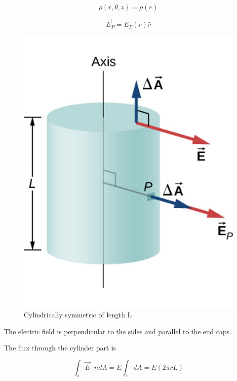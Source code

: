 \documentclass[14pt]{memoir}
\begin{document}
\begin{equation}
\rho(r,\theta,z) = \rho(r)
\end{equation}

\begin{equation}
\vec{E}_P = E_P(r)\hat{r}
\end{equation}


\begin{figure}[H]
\begin{center}
\includegraphics[scale=0.40]{fig/fig_06_29.jpg}
\caption{Cylindrically symmetric of length L}
\label{fig:06_29}
\end{center}
\end{figure}

The electric field is perpendicular to the sides and parallel to the end caps.

The flux through the cylinder part is

\begin{equation}
\int_s \vec{E} \cdot \hat{n} dA = E \int_s dA = E(2 \pi r L)
\end{equation}
\end{document}

